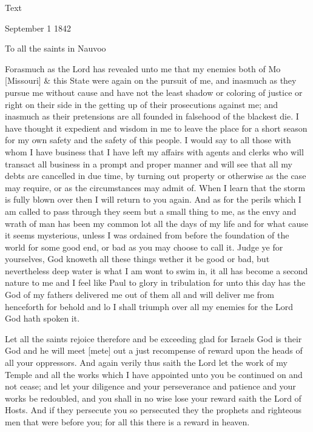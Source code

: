 			\begin{description}
				\item[Text]
			\end{description}
			
				\begin{tightright}
					September 1 1842
				\end{tightright}

				To all the saints in Nauvoo

				Forasmuch as the Lord has revealed unto me that my enemies both of Mo [Missouri] \& this State were again on the pursuit of me, and inasmuch as they pursue me without cause and have not the least shadow or coloring of justice or right on their side in the getting up of their prosecutions against me; and inasmuch as their pretensions are all founded in falsehood of the blackest die. I have thought it expedient and wisdom in me to leave the place for a short season for my own safety and the safety of this people. I would say to all those with whom I have business that I have left my affairs with agents and clerks who will transact all business in a prompt and proper manner and will see that all my debts are cancelled in due time, by turning out property or otherwise as the case may require, or as the circumstances may admit of. When I learn that the storm is fully blown over then I will return to you again. And as for the perils which I am called to pass through they seem but a small thing to me, as the envy and wrath of man has been my common lot all the days of my life and for what cause it seems mysterious, unless I was ordained from before the foundation of the world for some good end, or bad as you may choose to call it. Judge ye for yourselves, God knoweth all these things wether it be good or bad, but nevertheless deep water is what I am wont to swim in, it all has become a second nature to me and I feel like Paul to glory in tribulation for unto this day has the God of my fathers delivered me out of them all and will deliver me from henceforth for behold and lo I shall triumph over all my enemies for the Lord God hath spoken it.

				Let all the saints rejoice therefore and be exceeding glad for Israels God is their God and he will meet [mete] out a just recompense of reward upon the heads of all your oppressors. And again verily thus saith the Lord let the work of my Temple and all the works which I have appointed unto you be continued on and not cease; and let your diligence and your perseverance and patience and your works be redoubled, and you shall in no wise lose your reward saith the Lord of Hosts. And if they persecute you so persecuted they the prophets and righteous men that were before you; for all this there is a reward in heaven.

